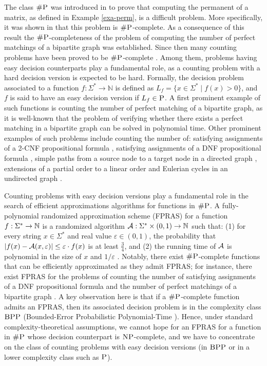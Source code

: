 
The class $\text{\sc \#P}$ was introduced in \cite{Valiant79} to prove that computing the permanent of a matrix, as defined in Example \ref{exa-perm}, is a difficult problem. More specifically, it was shown in  \cite{Valiant79}  that this problem is $\text{\sc \#P}$-complete. As a consequence of this result the $\text{\sc \#P}$-completeness of the problem of computing the number of perfect matchings of a bipartite graph was established.
Since then  many counting problems have been proved to be $\text{\sc \#P}$-complete \cite{V79b,PB83,P86,L86,BW91,HMRS98,BW05,DS12, PS13,PS14}. Among them, problems having easy decision counterparts play a fundamental role, as a counting problem with a hard decision version is expected to be hard. Formally, the decision problem associated to a function $f : \Sigma^* \to \mathbb{N}$ is defined as $L_f = \{ x \in \Sigma^* \mid f(x) > 0 \}$, and $f$ is said to have an easy decision version if $L_f \in \text{\sc P}$. A first prominent example of such functions is counting the number of perfect matching of a bipartite graph, as it is well-known that the problem of verifying whether there exists a perfect matching in a bipartite graph can be solved in polynomial time. Other prominent examples of such problems include counting the number of: satisfying assignments of a 2-CNF propositional formula \cite{V79b}, satisfying assignments of a DNF propositional formula \cite{DHK05}, simple paths from a source node to a target node in a directed graph \cite{V79b}, extensions of a partial order to a linear order \cite{BW91} and Eulerian cycles in an undirected graph \cite{BW05}. 

Counting problems with easy decision versions play a fundamental role in the search of efficient approximations algorithms for functions in $\text{\sc \#P}$. A fully-polynomial randomized approximation scheme (FPRAS) for a function $f : \Sigma^* \to \mathbb{N}$ is a randomized algorithm ${\cal A} : \Sigma^* \times (0,1) \to \bbN$ such that: (1) for every string $x \in \Sigma^*$ and real value $\varepsilon \in (0,1)$, the probability that $|f(x) - {\cal A}(x,\varepsilon)| \leq \varepsilon \cdot f(x)$ is at least $\frac{3}{4}$, and (2) the running time of ${\cal A}$ is polynomial in the size of $x$ and $1/\varepsilon$ \cite{KL83}. Notably, there exist $\text{\sc \#P}$-complete functions that can be efficiently approximated as they admit FPRAS; for instance, there exist FPRAS for the problems of counting the number of satisfying assignments of a DNF propositional formula \cite{KL83} and the number of perfect matchings of a bipartite graph \cite{JSV04}. A key observation here is that if a $\text{\sc \#P}$-complete function admits an FPRAS, then its associated decision problem is in the complexity class $\text{\sc BPP}$ (Bounded-Error Probabilistic Polynomial-Time \cite{G77}). Hence, under standard complexity-theoretical assumptions, we cannot hope for an FPRAS for a function in $\text{\sc \#P}$ whose decision counterpart is $\text{\sc NP}$-complete, and we have to concentrate on the class of counting problems with easy decision versions (in $\text{\sc BPP}$ or in a lower complexity class such as $\text{\sc P}$). 

